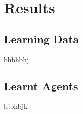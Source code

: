 
\section{Results}


\subsection{Learning Data}

bhbhbhj


\subsection{Learnt Agents}
\label{subsec:evallearnt}

bjbhbjk